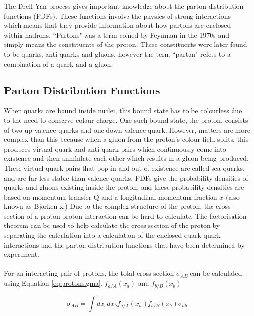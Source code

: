 \documentclass[11pt,oneside,a4paper]{article}
\begin{document}
The Drell-Yan process gives important knowledge about the parton distribution functions (PDFs). These functions involve the physics of strong interactions which means that they provide information about how partons are enclosed within hadrons. ``Partons" was a term coined by Feynman in the 1970s and simply means the constituents of the proton. These constituents were later found to be quarks, anti-quarks and gluons, however the term ``parton" refers to a combination of a quark and a gluon.

\subsection{Parton Distribution Functions}

When quarks are bound inside nuclei, this bound state has to be colourless due to the need to conserve colour charge. One such bound state, the proton, consists of two up valence quarks and one down valence quark. However, matters are more complex than this because when a gluon from the proton's colour field splits, this produces virtual quark and anti-quark pairs which continuously come into existence and then annihilate each other which results in a gluon being produced. These virtual quark pairs that pop in and out of existence are called sea quarks, and are far less stable than valence quarks. PDFs give the probability densities of quarks and gluons existing inside the proton, and these probability densities are based on momentum transfer Q and a longitudinal momentum fraction $x$ (also known as Bjorken x.) Due to the complex structure of the proton, the cross-section of a proton-proton interaction can be hard to calculate. The factorisation theorem can be used to help calculate the cross section of the proton by separating the calculation into a calculation of the enclosed quark-quark interactions and the parton distribution functions that have been determined by experiment. 
\paragraph{}
For an interacting pair of protons, the total cross section $\sigma_{AB}$ can be calculated using Equation \ref{eq:protonsigma}, $f_{a/A} (x_{a})$ and $f_{b/B} (x_{b})$

\begin{equation}
\label{eq:protonsigma}
\sigma_{AB} = \int dx_{a} dx_{b} f_{a/A} (x_{a}) f_{b/B} (x_{b})\sigma_{ab}
\end{equation}
\end{document}
